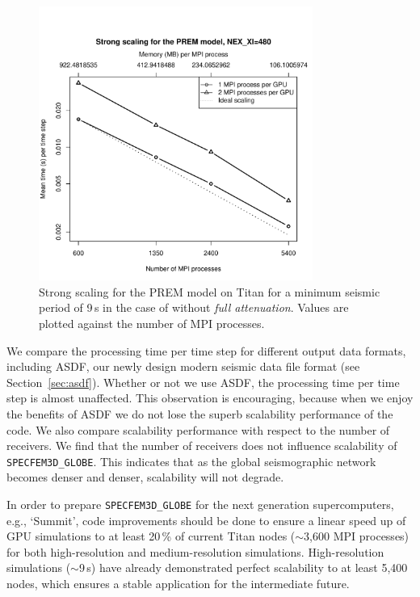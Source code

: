 \begin{figure}
  \centering
  \includegraphics[width=0.8\textwidth]{ch-workflow/figures/s480nounq}
  \caption[Strong scaling of SPECFEM3D GLOBE for the PREM Earth model on Titan for 9\,s minimum period w/o
  full attenuation]
	{Strong scaling for the PREM model on Titan for a minimum seismic
   period of 9\,s in the case of without \emph{full attenuation}.
   Values are plotted against the number of MPI processes. }
   \label{fig:s480nounq}
\end{figure}

We compare the processing time per time step for different output data formats,
including ASDF, our newly design modern seismic data file format (see
Section~\ref{sec:asdf}). Whether or not we use ASDF, the
processing time per time step is almost unaffected.
This observation is encouraging, because when we enjoy the benefits of
ASDF we do not lose the superb scalability performance of the code.
We
also compare scalability performance with respect to the number of receivers.
We find that the number of receivers does not influence scalability of 
\texttt{SPECFEM3D\_GLOBE}. This indicates that as the global
seismographic network becomes denser and denser, scalability will not degrade.

In order to prepare \texttt{SPECFEM3D\_GLOBE} for the next generation
supercomputers, e.g., `Summit', code improvements should be done to ensure a
linear speed up of GPU simulations to at least 20\,\% of current Titan nodes
($\sim$3,600 MPI processes) for both high-resolution and medium-resolution
simulations. High-resolution simulations ($\sim$9\,s) have already demonstrated
perfect scalability to at least 5,400 nodes, which ensures a stable
application for the intermediate future. 
